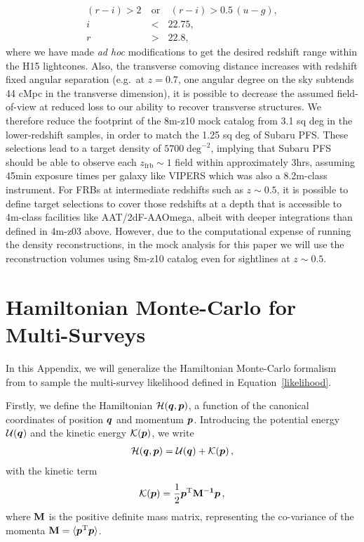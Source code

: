 \documentclass[twocolumn]{aastex63}
\newcommand{\zfrb}{\ensuremath{z_\mathrm{frb}}}
\newcommand{\persqdeg}{\ensuremath{\mathrm{deg}^{-2}}}
\newcommand{\mbi}[1]{\hbox{\boldmath{$#1$}}}
\newcommand{\mat}[1]{\ensuremath{\rm\bf #1}}
\newcommand{\ba}{\begin{eqnarray}}
\newcommand{\ea}{\end{eqnarray}}
\begin{document}
\begin{CJK*}{UTF8}{gbsn}
\begin{description}
\begin{eqnarray}
 (r-i) > 2\:  &\mathrm{or}& \: (r-i)  > 0.5\, (u-g),\nonumber \\
i &<& 22.75, \nonumber \\
r &>& 22.8, \nonumber  
\end{eqnarray}
where we have made \textit{ad hoc} modifications to get the desired redshift range within the H15 lightcones.
Also, 
the transverse comoving distance increases with redshift fixed angular separation (e.g.\ at $z=0.7$, one angular degree on the sky subtends
44 cMpc in the transverse dimension), it is possible to decrease the assumed field-of-view at reduced loss to our ability
to recover transverse structures. We therefore reduce the footprint of the 8m-z10 mock catalog from 3.1 sq deg in the lower-redshift
samples, in order to match the 1.25 sq deg of Subaru PFS.
These selections lead to a target density of $5700\;\persqdeg$, implying that Subaru PFS should be able to observe
each $\zfrb \sim 1$ field within approximately 3hrs, assuming 45min exposure times per galaxy like VIPERS which was also a 8.2m-class instrument. 
For FRBs at intermediate redshifts such as $z\sim 0.5$, it is possible to define target selections to cover those redshifts at a depth that is
accessible to 4m-class facilities like AAT/2dF-AAOmega, albeit with deeper integrations than defined in 4m-z03 above. However, due to the computational
expense of running the density reconstructions, in the mock analysis for this paper we will use the reconstruction volumes using 8m-z10 catalog even for sightlines at $z\sim0.5$. 

\end{description}


\section{Hamiltonian Monte-Carlo for Multi-Surveys}\label{app:hmc}

In this Appendix, we will generalize the Hamiltonian Monte-Carlo formalism from \citet{ata:2015} to sample the multi-survey
likelihood defined in Equation~\ref{likelihood}.

Firstly, we define the Hamiltonian $\mathcal{H}(\mbi{q},\mbi p)$, a function of the canonical coordinates of position $\mbi q$ and  momentum $\mbi p$. Introducing the potential energy $\mathcal{U}(\mbi{q})$ and the kinetic energy $\mathcal{K}(\mbi{p})$, we write
\ba
\label{eq:hamil}
\mathcal{H}(\mbi{q},\mbi{p})=\mathcal{U}(\mbi{q})+\mathcal{K}(\mbi{p})\,,
\ea
with the  kinetic term
\ba
\label{eq:mom}
\mathcal{K}(\mbi{p})=\frac{1}{2}\mbi{p}^{\rm T}\mat{M}^{-1}\mbi{p}\,,
\ea
where $\mat{M}$ is the positive definite mass matrix, representing the co-variance of the momenta $\mat M=\langle \mbi{p}^{\rm T} \mbi{p} \rangle$.


\end{CJK*}
\end{document}
